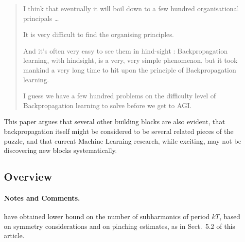 \documentclass{llncs}
\begin{document}
\begin{quotation}

I think that 
eventually it will boil down to a few hundred organisational principals
\dots



It is very difficult to find the organising principles.

And it's often very easy to see them in hind-sight : 
Backpropagation learning, with hindsight, is a very, very simple phenomenon, 
but it took mankind a  very long time to hit upon the principle of Backpropagation learning. 

I guess we have a few hundred problems on the difficulty level of Backpropagation learning to solve before we get to AGI. 


\end{quotation}

This paper argues that several other building blocks are also evident, 
that backpropagation itself might be considered to be several related pieces of the puzzle,
and that current Machine Learning research, while exciting, may not be
discovering new blocks systematically.

\subsection{Overview}



\paragraph{Notes and Comments.}

have obtained lower bound on the number of subharmonics of period $kT$,
based on symmetry considerations and on pinching estimates, as in
Sect.~5.2 of this article.
\end{document}
